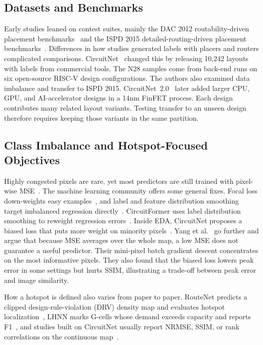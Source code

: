 \IfFileExists{./ieeeconf.cls}{\documentclass[9pt]{ieeeconf}}{\documentclass[conference]{IEEEtran}\usepackage[T1]{fontenc}}
\begin{document}
\subsection{Datasets and Benchmarks}
Early studies leaned on contest suites, mainly the DAC 2012 routability-driven placement benchmarks~\cite{viswanathan2012dac} and the ISPD 2015 detailed-routing-driven placement benchmarks~\cite{bustany2015ispd}. Differences in how studies generated labels with placers and routers complicated comparisons. CircuitNet~\cite{chai2022circuitnet,chai2023circuitnet} changed this by releasing 10,242 layouts with labels from commercial tools. The N28 samples come from back-end runs on six open-source RISC-V design configurations. The authors also examined data imbalance and transfer to ISPD 2015. CircuitNet~2.0~\cite{jiang2024circuitnet2} later added larger CPU, GPU, and AI-accelerator designs in a 14nm FinFET process. Each design contributes many related layout variants. Testing transfer to an unseen design therefore requires keeping those variants in the same partition.

\subsection{Class Imbalance and Hotspot-Focused Objectives}
Highly congested pixels are rare, yet most predictors are still trained with pixel-wise MSE~\cite{liu2021global}. The machine learning community offers some general fixes. Focal loss down-weights easy examples~\cite{lin2017focal}, and label and feature distribution smoothing target imbalanced regression directly~\cite{yang2021dir}. CircuitFormer uses label distribution smoothing to reweight regression errors~\cite{zou2023circuitformer}. Inside EDA, CircuitNet proposes a biased loss that puts more weight on minority pixels~\cite{chai2023circuitnet}. Yang et al.~\cite{yang2024mpgd} go further and argue that because MSE averages over the whole map, a low MSE does not guarantee a useful predictor. Their mini-pixel batch gradient descent concentrates on the most informative pixels. They also found that the biased loss lowers peak error in some settings but hurts SSIM, illustrating a trade-off between peak error and image similarity.

How a hotspot is defined also varies from paper to paper. RouteNet predicts a clipped design-rule-violation (DRV) density map and evaluates hotspot localization~\cite{xie2018routenet}, LHNN marks G-cells whose demand exceeds capacity and reports F1~\cite{wang2022lhnn}, and studies built on CircuitNet usually report NRMSE, SSIM, or rank correlations on the continuous map~\cite{chai2022circuitnet,zou2023circuitformer}.
\end{document}
